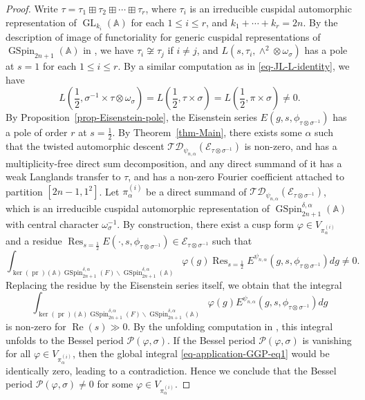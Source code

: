 \documentclass[12pt]{amsart}
\renewcommand{\Re}{\operatorname{Re}}
\newcommand{\A}{\mathbb{A}}
\newcommand{\Res}{\operatorname{Res}}
\newcommand{\TD}{\mathcal{TD}}
\newcommand{\CE}{{\mathcal{E}}}
\theoremstyle{remark}
\newcommand{\pr}{\operatorname{pr}}
\DeclareMathOperator{\GL}{GL}
\DeclareMathOperator{\GSpin}{GSpin}
\begin{document}
\begin{proof}
Write $\tau=\tau_1\boxplus \tau_2\boxplus \cdots \boxplus \tau_r$, where $\tau_i$ is an irreducible cuspidal automorphic representation of $\GL_{k_i}(\A)$ for each $1\le i \le r$, and $k_1+\cdots +k_r=2n$. By the description of image of functoriality for generic cuspidal representations of $\GSpin_{2n+1}(\A)$ in \cite{AsgariShahidi2006, AsgariShahidi2014}, we have $\tau_i\not\cong \tau_j$ if $i\not=j$, and $L(s,\tau_i,\wedge^2\otimes \omega_{\sigma})$ has a pole at $s=1$ for each $1\le i \le r$. By a similar computation as in \eqref{eq-JL-L-identity}, we have
\begin{equation*}
L(\frac{1}{2}, \sigma^{-1}\times \tau\otimes \omega_{\sigma})=L(\frac{1}{2}, \tau\times \sigma)=L(\frac{1}{2},\pi\times\sigma) \not=0.	
\end{equation*}
By Proposition~\ref{prop-Eisenstein-pole},  the Eisenstein series $E(g, s, \phi_{\tau\otimes\sigma^{-1}})$ has a pole of order $r$ at $s=\frac{1}{2}$. By Theorem~\ref{thm-Main}, there exists some $\alpha$ such that the twisted automorphic descent $\TD_{\psi_{n,\alpha}}(\CE_{\tau\otimes\sigma^{-1}})$ is non-zero, and has a multiplicity-free direct sum decomposition, and any direct summand of it has a weak Langlands transfer to $\tau$, and has a non-zero Fourier coefficient attached to partition $[2n-1, 1^2]$. Let $\pi_{\alpha}^{(i)}$ be a direct summand of $\TD_{\psi_{n,\alpha}}(\CE_{\tau\otimes\sigma^{-1}})$, which is an irreducible cuspidal automorphic representation of $\GSpin^{\delta,\alpha}_{2n+1}(\A)$ with central character $\omega_{\sigma}^{-1}$. By construction, there exist a cusp form 
 $\varphi \in V_{\pi_\alpha^{(i)}}$ and a residue $\Res_{s=\frac{1}{2}}E(\cdot, s, \phi_{\tau\otimes\sigma^{-1} })\in \CE_{\tau\otimes\sigma^{-1} }$ such that 
\begin{equation*}
\int_{ \ker(\pr)(\A) \GSpin_{2n+1}^{\delta,\alpha}(F)\backslash \GSpin_{2n+1}^{\delta,\alpha}(\A)} \varphi(g)  \Res_{s=\frac{1}{2}} E^{\psi_{n,\alpha}} (g, s, \phi_{\tau\otimes\sigma^{-1}})dg\not=0.
\end{equation*}
Replacing the residue by the Eisenstein series itself, we obtain that the integral
\begin{equation}
\label{eq-application-GGP-eq1}
\int_{ \ker(\pr)(\A) \GSpin_{2n+1}^{\delta,\alpha}(F)\backslash \GSpin_{2n+1}^{\delta,\alpha}(\A)} \varphi(g)    E^{\psi_{n,\alpha}} (g, s, \phi_{\tau\otimes\sigma^{-1} })dg 
\end{equation}
is non-zero for $\Re(s)\gg 0$. By the unfolding computation in \cite{Yan2025GGP}, this integral unfolds to the Bessel period $\mathcal{P}(\varphi, \sigma)$. If the Bessel period $\mathcal{P}(\varphi, \sigma)$ is vanishing for all $\varphi \in V_{\pi_\alpha^{(i)}}$, then the global integral \eqref{eq-application-GGP-eq1} would be identically zero, leading to a contradiction. Hence we conclude that the Bessel period $\mathcal{P}(\varphi,\sigma)\not=0$ for some $\varphi \in V_{\pi_\alpha^{(i)}}$.
\end{proof}







\end{document}
